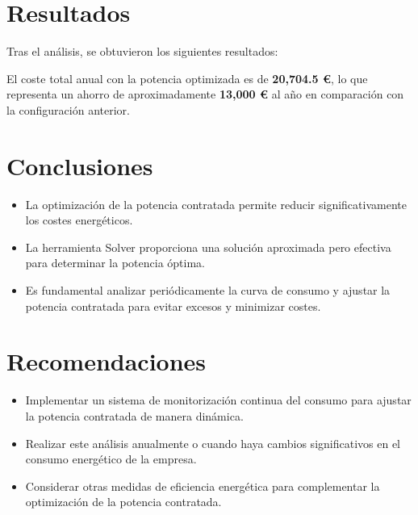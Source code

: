 \documentclass[a4paper,10pt]{article}
\begin{document}
\begin{Form}
\section{Resultados}
Tras el análisis, se obtuvieron los siguientes resultados:



El coste total anual con la potencia optimizada es de \textbf{20,704.5 €}, lo que representa un ahorro de aproximadamente \textbf{13,000 €} al año en comparación con la configuración anterior.

\section{Conclusiones}
\begin{itemize}
    \item La optimización de la potencia contratada permite reducir significativamente los costes energéticos.
    \item La herramienta Solver proporciona una solución aproximada pero efectiva para determinar la potencia óptima.
    \item Es fundamental analizar periódicamente la curva de consumo y ajustar la potencia contratada para evitar excesos y minimizar costes.
\end{itemize}

\section{Recomendaciones}
\begin{itemize}
    \item Implementar un sistema de monitorización continua del consumo para ajustar la potencia contratada de manera dinámica.
    \item Realizar este análisis anualmente o cuando haya cambios significativos en el consumo energético de la empresa.
    \item Considerar otras medidas de eficiencia energética para complementar la optimización de la potencia contratada.
\end{itemize}
















\begin{thebibliography}{99}



\end{thebibliography}
\end{Form}
\end{document}
